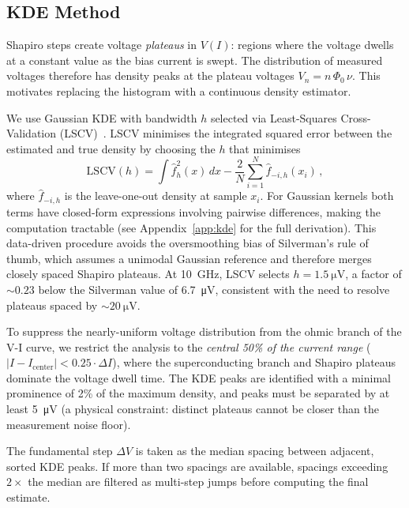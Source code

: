 \documentclass[12pt,a4paper]{article}
\begin{document}
\subsection{KDE Method}

Shapiro steps create voltage \emph{plateaus} in $V(I)$: regions where the voltage
dwells at a constant value as the bias current is swept. The distribution of measured
voltages therefore has density peaks at the plateau voltages $V_n = n\,\Phi_0\,\nu$.
This motivates replacing the histogram with a continuous density estimator.

We use Gaussian KDE with bandwidth $h$ selected via Least-Squares
Cross-Validation (LSCV)~\cite{oser}. LSCV minimises the integrated squared
error between the estimated and true density by choosing the $h$ that minimises
\begin{equation}
    \mathrm{LSCV}(h) = \int \hat{f}_h^2(x)\,dx
      - \frac{2}{N}\sum_{i=1}^{N} \hat{f}_{-i,h}(x_i)\,,
    \label{eq:lscv}
\end{equation}
where $\hat{f}_{-i,h}$ is the leave-one-out density at sample $x_i$. For
Gaussian kernels both terms have closed-form expressions involving pairwise
differences, making the computation tractable (see Appendix~\ref{app:kde} for
the full derivation). This data-driven procedure avoids the oversmoothing bias
of Silverman's rule of thumb, which assumes a unimodal Gaussian reference and
therefore merges closely spaced Shapiro plateaus. At \SI{10}{\giga\hertz}, LSCV
selects $h = \SI{1.5}{\micro\volt}$, a factor of $\sim\!0.23$ below the Silverman
value of \SI{6.7}{\micro\volt}, consistent with the need to resolve plateaus spaced
by $\sim\!\SI{20}{\micro\volt}$.

To suppress the nearly-uniform voltage distribution from the ohmic branch of the
V-I curve, we restrict the analysis to the \emph{central 50\% of the current range}
($|I - I_\mathrm{center}| < 0.25 \cdot \Delta I$), where the superconducting branch
and Shapiro plateaus dominate the voltage dwell time. The KDE peaks are identified
with a minimal prominence of 2\% of the maximum density, and peaks must be separated
by at least \SI{5}{\micro\volt} (a physical constraint: distinct plateaus cannot be
closer than the measurement noise floor).

The fundamental step $\Delta V$ is taken as the median spacing between adjacent,
sorted KDE peaks. If more than two spacings are available, spacings exceeding
$2\times$ the median are filtered as multi-step jumps before computing the final
estimate.
\end{document}
